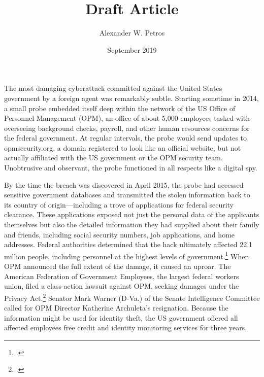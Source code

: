 \documentclass[14pt]{extarticle}
\title{Draft Article}
\author{Alexander W. Petros}
\date{September 2019}
\begin{document}
\maketitle

The most damaging cyberattack committed against the United States government by a foreign agent was remarkably subtle. Starting sometime in 2014, a small probe embedded itself deep within the network of the US Office of Personnel Management (OPM), an office of about 5,000 employees tasked with overseeing background checks, payroll, and other human resources concerns for the federal government. At regular intervals, the probe would send updates to opmsecurity.org, a domain registered to look like an official website, but not actually affiliated with the US government or the OPM security team. Unobtrusive and observant, the probe functioned in all respects like a digital spy.

By the time the breach was discovered in April 2015, the probe had accessed sensitive government databases and transmitted the stolen information back to its country of origin---including a trove of applications for federal security clearance. These applications exposed not just the personal data of the applicants themselves but also the detailed information they had supplied about their family and friends, including social security numbers, job applications, and home addresses. Federal authorities determined that the hack ultimately affected 22.1 million people, including personnel at the highest levels of government.\footcite{nakashima_hacks_2015} When OPM announced the full extent of the damage, it caused an uproar. The American Federation of Government Employees, the largest federal workers union, filed a class-action lawsuit against OPM, seeking damages under the Privacy Act.\footcite{chalfant_court_2017} Senator Mark Warner (D-Va.) of the Senate Intelligence Committee called for OPM Director Katherine Archuleta's resignation. Because the information might be used for identity theft, the US government offered all affected employees free credit and identity monitoring services for three years.
\end{document}
